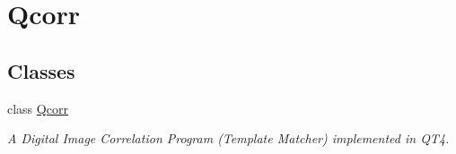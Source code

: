 \hypertarget{group__qcorr__mainwindow}{
\section{Qcorr}
\label{group__qcorr__mainwindow}
}
\subsection*{Classes}
\begin{CompactItemize}
\item 
class \hyperlink{classQcorr}{Qcorr}
\begin{CompactList}\small\item\em A Digital Image Correlation Program (Template Matcher) implemented in QT4. \item\end{CompactList}\end{CompactItemize}

